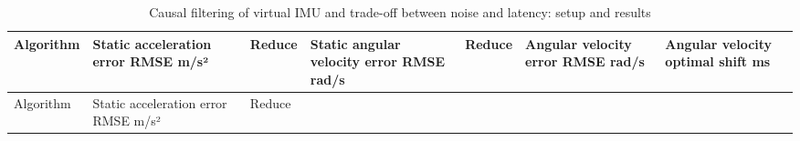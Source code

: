 \FloatBarrier\begingroup\small\setlength{\tabcolsep}{2.5pt}
\begin{longtable}[]{@{}
  >{\raggedright\arraybackslash}p{}
  >{\raggedleft\arraybackslash}p{}
  >{\raggedleft\arraybackslash}p{}
  >{\raggedleft\arraybackslash}p{}
  >{\raggedleft\arraybackslash}p{}
  >{\raggedleft\arraybackslash}p{}
  >{\raggedleft\arraybackslash}p{}@{}}
\caption{Causal filtering of virtual IMU and trade-off between noise and latency: setup and results}\label{tab:s06-1}\tabularnewline
\toprule\noalign{}
\begin{minipage}[b]{\linewidth}\raggedright
Algorithm
\end{minipage} & \begin{minipage}[b]{\linewidth}\raggedleft
Static acceleration error RMSE m/s²
\end{minipage} & \begin{minipage}[b]{\linewidth}\raggedleft
Reduce
\end{minipage} & \begin{minipage}[b]{\linewidth}\raggedleft
Static angular velocity error RMSE rad/s
\end{minipage} & \begin{minipage}[b]{\linewidth}\raggedleft
Reduce
\end{minipage} & \begin{minipage}[b]{\linewidth}\raggedleft
Angular velocity error RMSE rad/s
\end{minipage} & \begin{minipage}[b]{\linewidth}\raggedleft
Angular velocity optimal shift ms
\end{minipage} \\
\midrule\noalign{}
\endfirsthead
\toprule\noalign{}
\begin{minipage}[b]{\linewidth}\raggedright
Algorithm
\end{minipage} & \begin{minipage}[b]{\linewidth}\raggedleft
Static acceleration error RMSE m/s²
\end{minipage} & \begin{minipage}[b]{\linewidth}\raggedleft
Reduce
\end{minipage} & \begin{minipage}[b]{\linewidth}\raggedleft

\end{minipage}
\end{longtable}
